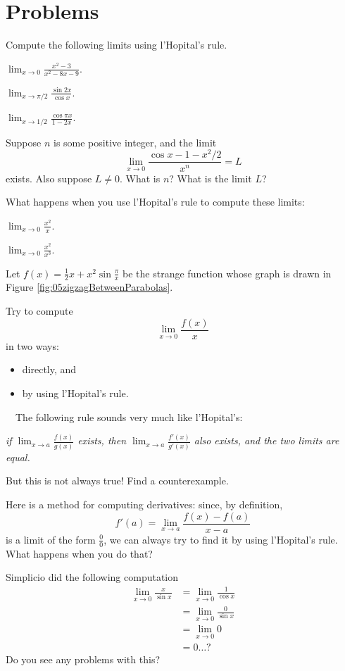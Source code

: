 \section{Problems}
\problemfont
\begin{multicols}{2}
\problem Compute the following limits using l'Hopital's rule.

\subprob $\displaystyle \lim_{x\to 0} \frac{x^2-3} {x^2-8x-9}$.

\subprob $\displaystyle\lim_{x\to \pi/2} \frac{\sin 2x} {\cos x}$.

\subprob $\displaystyle\lim_{x\to 1/2} \frac{\cos \pi x} {1-2x}$.


\problem Suppose $n$ is some positive integer, and the limit
\[
\lim_{x\to0} \frac{\cos x -1 -x^2/2} {x^n} = L
\]
exists. Also suppose $L\neq0$.
What is $n$?  What is the limit $L$?



\problem What happens when you use l'Hopital's rule to compute these
limits:

\subprob $\displaystyle\lim_{x\to 0} \frac{x^2} {x}$.

\subprob $\displaystyle\lim_{x\to 0} \frac{x^2} {x^3}$.

\problem  Let $f(x) = \frac12x + x^2\sin\frac\pi x$ be the strange
function whose graph is drawn in Figure
\ref{fig:05zigzagBetweenParabolas}.

\subprob Try to compute
\[
\lim_{x\to 0} \frac{f(x)} {x}
\]
in two ways:
\begin{itemize}
\item directly, and
\item by using l'Hopital's rule.
\end{itemize}

\subprob \carefulnow\carefulnow~~The following rule sounds very much
like l'Hopital's:
\begin{center}
  \itshape if $\displaystyle\lim_{x\to a} \frac{f(x)} {g(x)}$ exists,
  then $\displaystyle\lim_{x\to a} \frac{f'(x)} {g'(x)}$ also exists,
  and the two limits are equal.
\end{center}
But this is not always true!  Find a counterexample.


\problem Here is a method for computing derivatives: since, by
definition,
\[
f'(a) = \lim_{x\to a} \frac{f(x) - f(a)} {x-a}
\]
is a limit of the form $\frac00$, we can always try to find it by
using l'Hopital's rule.  What happens when you do that?

\problem Simplicio did the following computation
\begin{align*}
  \lim_{x\to 0} \frac{x} {\sin x}
  &= \lim_{x\to 0} \frac{1} {\cos x}\\
  &= \lim_{x\to 0} \frac{0}{\sin x}\\
  &= \lim_{x\to 0} 0\\
  &= 0\ldots?
\end{align*}
Do you see any problems with this?

\end{multicols}
\noproblemfont


